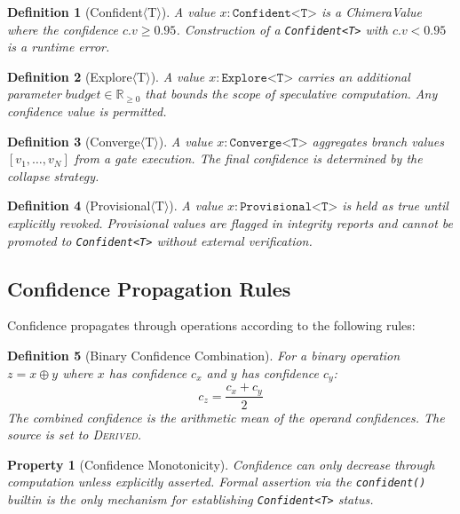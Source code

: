 \documentclass[11pt,a4paper]{article}
\newtheorem{definition}{Definition}[section]
\newtheorem{property}{Property}[section]
\begin{document}
\begin{definition}[Confident$\langle$T$\rangle$]
A value $x : \texttt{Confident<T>}$ is a ChimeraValue where the confidence
$c.v \geq 0.95$. Construction of a \texttt{Confident<T>} with $c.v < 0.95$
is a runtime error.
\end{definition}

\begin{definition}[Explore$\langle$T$\rangle$]
A value $x : \texttt{Explore<T>}$ carries an additional parameter
$\mathit{budget} \in \mathbb{R}_{\geq 0}$ that bounds the scope of
speculative computation. Any confidence value is permitted.
\end{definition}

\begin{definition}[Converge$\langle$T$\rangle$]
A value $x : \texttt{Converge<T>}$ aggregates branch values
$[v_1, \ldots, v_N]$ from a gate execution. The final confidence is
determined by the collapse strategy.
\end{definition}

\begin{definition}[Provisional$\langle$T$\rangle$]
A value $x : \texttt{Provisional<T>}$ is held as true until explicitly
revoked. Provisional values are flagged in integrity reports and
cannot be promoted to \texttt{Confident<T>} without external verification.
\end{definition}

\subsection{Confidence Propagation Rules}

Confidence propagates through operations according to the following rules:

\begin{definition}[Binary Confidence Combination]
\label{def:combine}
For a binary operation $z = x \oplus y$ where $x$ has confidence $c_x$ and
$y$ has confidence $c_y$:
\[
  c_z = \frac{c_x + c_y}{2}
\]
The combined confidence is the arithmetic mean of the operand confidences.
The source is set to \textsc{Derived}.
\end{definition}

\begin{property}[Confidence Monotonicity]
Confidence can only decrease through computation unless explicitly asserted.
Formal assertion via the \texttt{confident()} builtin is the only mechanism
for establishing \texttt{Confident<T>} status.
\end{property}
\end{document}
